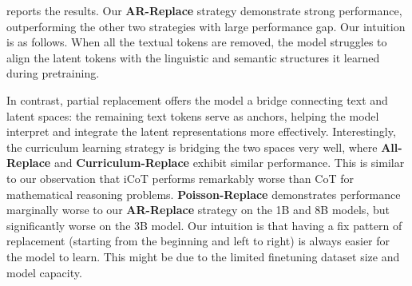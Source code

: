  reports the results.  Our \textbf{AR-Replace} strategy demonstrate strong performance, outperforming the other two strategies with large performance gap. Our intuition is as follows.
When all the textual tokens are removed, the model struggles to align the latent tokens with the linguistic and semantic structures it learned during pretraining. 

In contrast, partial replacement offers the model a bridge connecting text and latent spaces: the remaining text tokens serve as anchors, helping the model interpret and integrate the latent representations more effectively. 
Interestingly, the curriculum learning strategy is bridging the two spaces very well, where \textbf{All-Replace} and \textbf{Curriculum-Replace} exhibit similar performance. This is similar to our observation that iCoT performs remarkably worse than CoT for mathematical reasoning problems.
\textbf{Poisson-Replace} demonstrates performance marginally worse to our \textbf{AR-Replace} strategy on the 1B and 8B models, but significantly worse on the 3B model. Our intuition is that having a fix pattern of replacement (starting from the beginning and left to right) is always easier for the model to learn. This might be due to the limited finetuning dataset size and model capacity. 



